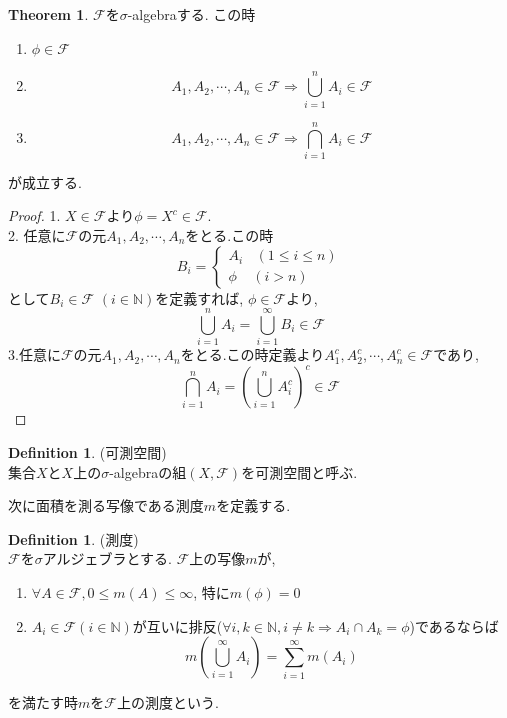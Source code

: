 \documentclass[11pt, a4paper, dvipdfmx]{jsbook}
\theoremstyle{definition}
\newtheorem{Definition+}[Axiom+]{Definition}
\newtheorem{Theorem+}[Axiom+]{Theorem}
\newcommand{\N}{\mathbb{N}}
\newcommand{\F}{\mathcal{F}}
\begin{document}
  \begin{Theorem+}
    $\F$を$\sigma$-algebraする. この時
    \begin{enumerate}
      \item $\phi\in\F$
      \item \begin{equation*}
        A_{1},A_{2},\cdots, A_{n}\in\F\Longrightarrow \bigcup_{i = 1}^{n}A_{i}\in\F
      \end{equation*}
      \item \begin{equation*}
        A_{1},A_{2},\cdots, A_{n}\in\F\Longrightarrow \bigcap_{i = 1}^{n}A_{i}\in\F
      \end{equation*}
    \end{enumerate}
  が成立する.
  \begin{proof}
    1. $X\in\F$より$\phi = X^{c}\in\F$.\\
    2.  任意に$\F$の元$A_{1}, A_{2},\cdots, A_{n}$をとる.この時
    \begin{equation*}
      B_{i} =
      \begin{cases}
      A_{i} ~~~~(1 \leq i \leq n) \\
      \phi  ~~~~~(i > n)
    \end{cases}
    \end{equation*}
    として$B_{i}\in\F$ $(i\in\N)$を定義すれば, $\phi\in\F$より,
    \begin{equation*}
      \bigcup_{i = 1}^{n} A_{i}= \bigcup_{i = 1}^{\infty} B_{i}\in\F
    \end{equation*}
    3.任意に$\F$の元$A_{1}, A_{2},\cdots, A_{n}$をとる.この時定義より$A_{1}^{c}, A_{2}^{c}, \cdots, A_{n}^{c}\in\F$であり,
    \begin{equation*}
      \bigcap_{i = 1}^{n}A_{i} =  \left(\bigcup_{i = 1}^{n}A_{i}^{c}\right)^{c}\in\F
    \end{equation*}
  \end{proof}
\end{Theorem+}
\begin{Definition+}(可測空間)\\
  集合$X$と$X$上の$\sigma$-algebraの組$(X, \F)$を可測空間と呼ぶ.
\end{Definition+}
次に面積を測る写像である測度$m$を定義する.
\begin{Definition+}(測度)\\
  $\F$を$\sigma$アルジェブラとする. $\F$上の写像$m$が,
  \begin{enumerate}
    \item  $\forall A\in\F, 0\leq m(A) \leq \infty$, 特に$m(\phi) = 0$
    \item $A_{i}\in\F(i\in\N)$が互いに排反($\forall i, k\in\N, i\neq k\Rightarrow A_{i}\cap A_{k} = \phi$)であるならば
    \begin{equation*}
      m\left(\bigcup_{i = 1}^{\infty}A_{i}\right) = \sum_{i = 1}^{\infty} m\left(A_{i}\right)
    \end{equation*}
  \end{enumerate}
  を満たす時$m$を$\F$上の測度という.
\end{Definition+}
\end{document}
